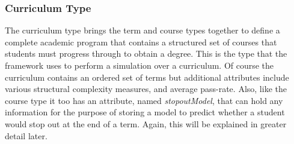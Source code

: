 \documentclass[botnum, fleqn]{unmeethesis}
\begin{document}

        

      \subsubsection{Curriculum Type}
        The curriculum type brings the term and course types together to define a complete academic program that contains a structured set of courses that students must progress through to obtain a degree. This is the type that the framework uses to perform a simulation over a curriculum. Of course the curriculum contains an ordered set of terms but additional attributes include various structural complexity measures, and average pass-rate. Also, like the course type it too has an attribute, named \textit{stopoutModel}, that can hold any information for the purpose of storing a model to predict whether a student would stop out at the end of a term. Again, this will be explained in greater detail later.


\end{document}
